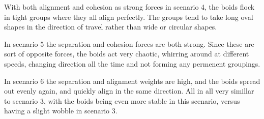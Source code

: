 With both alignment and cohesion as strong forces in scenario 4, the boids flock in tight groups where they all align perfectly.
The groups tend to take long oval shapes in the direction of travel rather than wide or circular shapes.

In scenario 5 the separation and cohesion forces are both strong.
Since these are sort of opposite forces, the boids act very chaotic, whirring around at different speeds, changing direction all the time and not forming any permenent groupings.

In scenario 6 the separation and alignment weights are high, and the boids spread out evenly again, and quickly align in the same direction.
All in all very simillar to scenario 3, with the boids being even more stable in this scenario,
versus having a slight wobble in scenario 3.

